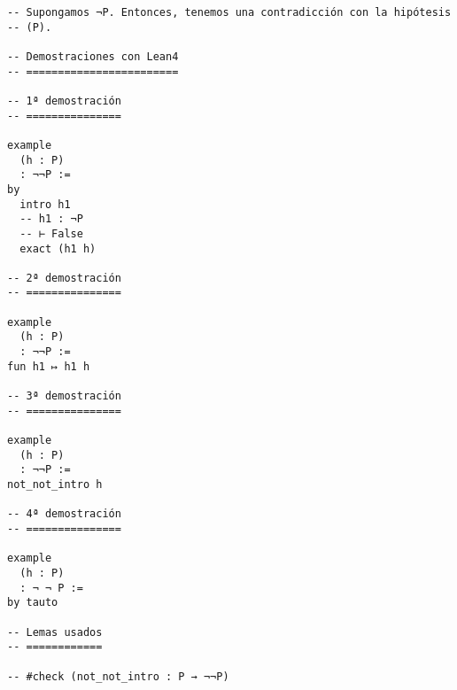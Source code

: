 \begin{verbatim}
-- Supongamos ¬P. Entonces, tenemos una contradicción con la hipótesis
-- (P).

-- Demostraciones con Lean4
-- ========================

-- 1ª demostración
-- ===============

example
  (h : P)
  : ¬¬P :=
by
  intro h1
  -- h1 : ¬P
  -- ⊢ False
  exact (h1 h)

-- 2ª demostración
-- ===============

example
  (h : P)
  : ¬¬P :=
fun h1 ↦ h1 h

-- 3ª demostración
-- ===============

example
  (h : P)
  : ¬¬P :=
not_not_intro h

-- 4ª demostración
-- ===============

example
  (h : P)
  : ¬ ¬ P :=
by tauto

-- Lemas usados
-- ============

-- #check (not_not_intro : P → ¬¬P)
\end{verbatim}

